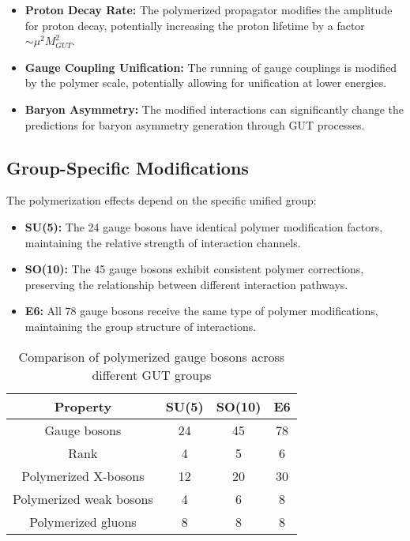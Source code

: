 \documentclass[11pt]{article}
\begin{document}
\begin{itemize}
    \item \textbf{Proton Decay Rate:} The polymerized propagator modifies the amplitude for proton decay, potentially increasing the proton lifetime by a factor $\sim \mu^2 M_{GUT}^2$.
    
    \item \textbf{Gauge Coupling Unification:} The running of gauge couplings is modified by the polymer scale, potentially allowing for unification at lower energies.
    
    \item \textbf{Baryon Asymmetry:} The modified interactions can significantly change the predictions for baryon asymmetry generation through GUT processes.
\end{itemize}

\subsection{Group-Specific Modifications}
The polymerization effects depend on the specific unified group:

\begin{itemize}
    \item \textbf{SU(5):} The 24 gauge bosons have identical polymer modification factors, maintaining the relative strength of interaction channels.
    
    \item \textbf{SO(10):} The 45 gauge bosons exhibit consistent polymer corrections, preserving the relationship between different interaction pathways.
    
    \item \textbf{E6:} All 78 gauge bosons receive the same type of polymer modifications, maintaining the group structure of interactions.
\end{itemize}

\begin{table}[h]
\centering
\begin{tabular}{|c|c|c|c|}
\hline
\textbf{Property} & \textbf{SU(5)} & \textbf{SO(10)} & \textbf{E6} \\
\hline
Gauge bosons & 24 & 45 & 78 \\
Rank & 4 & 5 & 6 \\
Polymerized X-bosons & 12 & 20 & 30 \\
Polymerized weak bosons & 4 & 6 & 8 \\
Polymerized gluons & 8 & 8 & 8 \\
\hline
\end{tabular}
\caption{Comparison of polymerized gauge bosons across different GUT groups}
\label{tab:comparison}
\end{table}
\end{document}
